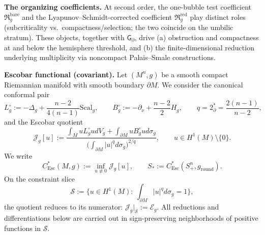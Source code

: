 \documentclass[11pt,reqno,a4paper]{amsart}
\numberwithin{equation}{section}
\theoremstyle{plain}
\newcommand{\Scal}{\mathrm{Scal}}
\newcommand{\Esc}{\ensuremath{\mathrm{Esc}}}
\theoremstyle{remark}
\theoremstyle{plain}
\begin{document}
\medskip
\noindent\textbf{The organizing coefficients.}
At second order, the one-bubble test coefficient $\mathfrak R_g^{\mathrm{bare}}$ and the
Lyapunov--Schmidt-corrected coefficient $\mathfrak R_g^{\mathrm{red}}$ play distinct roles
(subcriticality vs.\ compactness/selection; the two coincide on the umbilic stratum).
These objects, together with $\mathsf G_\partial$, drive
(a) obstruction and compactness at and below the hemisphere threshold, and (b) the
finite-dimensional reduction underlying multiplicity via noncompact Palais--Smale constructions.

\medskip
\noindent\textbf{Escobar functional (covariant).}
Let $(M^n,g)$ be a smooth compact Riemannian manifold with smooth boundary $\partial M$.
We consider the canonical conformal pair
\begin{equation}\label{eq:intro-conformal-pair}
L_g^{\circ}:=-\Delta_g+\frac{n-2}{4(n-1)}\Scal_g,\qquad
B_g^{\circ}:=-\partial_\nu+\frac{n-2}{2}H_g,\qquad
q=2^*_{\partial}=\frac{2(n-1)}{n-2},
\end{equation}
and the Escobar quotient
\begin{equation}\label{eq:intro-Escobar}
\mathcal J_g[u]
:=\frac{\displaystyle\int_M uL_g^{\circ}udV_g+\int_{\partial M} uB_g^{\circ}ud\sigma_g}
{\Big(\displaystyle\int_{\partial M}|u|^{q}d\sigma_g\Big)^{2/q}},
\qquad u\in H^1(M)\setminus\{0\}.
\end{equation}
We write
\begin{equation}\label{eq:intro-Escobar-constants}
C^*_{\Esc}(M,g):=\inf_{u\not\equiv0}\mathcal J_g[u],\qquad
S_\ast:=C^*_{\Esc}(S^n_+,g_{\mathrm{round}}).
\end{equation}
On the constraint slice
\[
\mathcal S:=\Big\{u\in H^1(M):\ \int_{\partial M}|u|^qd\sigma_g=1\Big\},
\]
the quotient reduces to its numerator:
$\mathcal J_g|_{\mathcal S}:=\mathcal E_g$.
All reductions and differentiations below are carried out in sign-preserving neighborhoods of
positive functions in $\mathcal S$.
\end{document}
